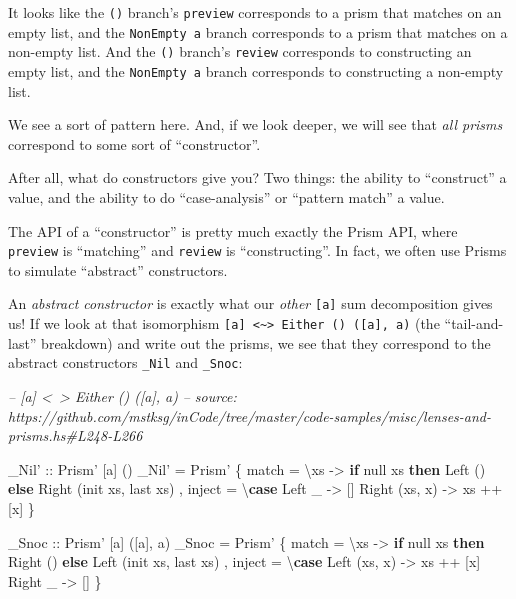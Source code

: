 \documentclass[]{article}
\newenvironment{Shaded}{}{}
\newcommand{\CommentTok}[1]{\textcolor[rgb]{0.38,0.63,0.69}{\textit{#1}}}
\newcommand{\DataTypeTok}[1]{\textcolor[rgb]{0.56,0.13,0.00}{#1}}
\newcommand{\FunctionTok}[1]{\textcolor[rgb]{0.02,0.16,0.49}{#1}}
\newcommand{\KeywordTok}[1]{\textcolor[rgb]{0.00,0.44,0.13}{\textbf{#1}}}
\newcommand{\NormalTok}[1]{#1}
\newcommand{\OtherTok}[1]{\textcolor[rgb]{0.00,0.44,0.13}{#1}}
\begin{document}
It looks like the \texttt{()} branch's \texttt{preview} corresponds to a prism
that matches on an empty list, and the \texttt{NonEmpty\ a} branch corresponds
to a prism that matches on a non-empty list. And the \texttt{()} branch's
\texttt{review} corresponds to constructing an empty list, and the
\texttt{NonEmpty\ a} branch corresponds to constructing a non-empty list.

We see a sort of pattern here. And, if we look deeper, we will see that
\emph{all prisms} correspond to some sort of ``constructor''.

After all, what do constructors give you? Two things: the ability to
``construct'' a value, and the ability to do ``case-analysis'' or ``pattern
match'' a value.

The API of a ``constructor'' is pretty much exactly the Prism API, where
\texttt{preview} is ``matching'' and \texttt{review} is ``constructing''. In
fact, we often use Prisms to simulate ``abstract'' constructors.

An \emph{abstract constructor} is exactly what our \emph{other} \texttt{{[}a{]}}
sum decomposition gives us! If we look at that isomorphism
\texttt{{[}a{]}\ \textless{}\textasciitilde{}\textgreater{}\ Either\ ()\ ({[}a{]},\ a)}
(the ``tail-and-last'' breakdown) and write out the prisms, we see that they
correspond to the abstract constructors \texttt{\_Nil} and \texttt{\_Snoc}:

\begin{Shaded}
\begin{Highlighting}[]
\CommentTok{-- [a] <~> Either () ([a], a)}
\CommentTok{-- source: https://github.com/mstksg/inCode/tree/master/code-samples/misc/lenses-and-prisms.hs#L248-L266}

\OtherTok{_Nil' ::} \DataTypeTok{Prism'}\NormalTok{ [a] ()}
\NormalTok{_Nil' }\FunctionTok{=} \DataTypeTok{Prism'}
\NormalTok{    \{ match  }\FunctionTok{=}\NormalTok{ \textbackslash{}xs }\OtherTok{->} \KeywordTok{if}\NormalTok{ null xs}
        \KeywordTok{then} \DataTypeTok{Left}\NormalTok{  ()}
        \KeywordTok{else} \DataTypeTok{Right}\NormalTok{ (init xs, last xs)}
\NormalTok{    , inject }\FunctionTok{=}\NormalTok{ \textbackslash{}}\KeywordTok{case}
        \DataTypeTok{Left}\NormalTok{ _        }\OtherTok{->}\NormalTok{ []}
        \DataTypeTok{Right}\NormalTok{ (xs, x) }\OtherTok{->}\NormalTok{ xs }\FunctionTok{++}\NormalTok{ [x]}
\NormalTok{    \}}

\OtherTok{_Snoc ::} \DataTypeTok{Prism'}\NormalTok{ [a] ([a], a)}
\NormalTok{_Snoc }\FunctionTok{=} \DataTypeTok{Prism'}
\NormalTok{    \{ match  }\FunctionTok{=}\NormalTok{ \textbackslash{}xs }\OtherTok{->} \KeywordTok{if}\NormalTok{ null xs}
        \KeywordTok{then} \DataTypeTok{Right}\NormalTok{ ()}
        \KeywordTok{else} \DataTypeTok{Left}\NormalTok{  (init xs, last xs)}
\NormalTok{    , inject }\FunctionTok{=}\NormalTok{ \textbackslash{}}\KeywordTok{case}
        \DataTypeTok{Left}\NormalTok{  (xs, x) }\OtherTok{->}\NormalTok{ xs }\FunctionTok{++}\NormalTok{ [x]}
        \DataTypeTok{Right}\NormalTok{ _       }\OtherTok{->}\NormalTok{ []}
\NormalTok{    \}}
\end{Highlighting}
\end{Shaded}
\end{document}
